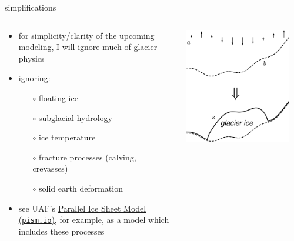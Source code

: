 \documentclass[svgnames,
               hyperref={colorlinks,citecolor=DeepPink4,linkcolor=FireBrick,urlcolor=Maroon},
               usepdftitle=false]  %
               {beamer}
\begin{document}
\begin{frame}{simplifications}

\begin{columns}
\begin{column}{0.6\textwidth}
\begin{itemize}
\item for simplicity/clarity of the upcoming modeling, I will ignore much of glacier physics
\item \alert{ignoring}:
    \begin{itemize}
    \item[$\circ$] floating ice
    \item[$\circ$] subglacial hydrology
    \item[$\circ$] ice temperature
    \item[$\circ$] fracture processes (calving, crevasses)
    \item[$\circ$] solid earth deformation
    \end{itemize}

\medskip
\item {\footnotesize see UAF's \href{https://pism.io/}{Parallel Ice Sheet Model (\texttt{pism.io})}, for example, as a model which includes these processes}
\end{itemize}
\end{column}
\begin{column}{0.42\textwidth}
\hfill \includegraphics[width=0.9\textwidth]{../images/map-glacier-ice.png}
\end{column}
\end{columns}
\end{frame}
\end{document}
